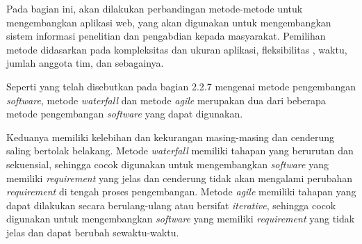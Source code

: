 Pada bagian ini, akan dilakukan perbandingan metode-metode untuk mengembangkan aplikasi web, 
yang akan digunakan untuk mengembangkan sistem informasi penelitian dan pengabdian kepada 
masyarakat. Pemilihan metode didasarkan pada kompleksitas dan ukuran aplikasi, fleksibilitas 
, waktu, jumlah anggota tim, dan sebagainya. 

Seperti yang telah disebutkan pada bagian 2.2.7 mengenai metode pengembangan \textit{software}, 
metode \textit{waterfall} dan metode \textit{agile} merupakan dua dari beberapa metode 
pengembangan \textit{software} yang dapat digunakan. 

Keduanya memiliki kelebihan dan 
kekurangan masing-masing dan cenderung saling bertolak belakang. Metode \textit{waterfall} 
memiliki tahapan yang berurutan dan sekuensial, sehingga cocok digunakan untuk mengembangkan 
\textit{software} yang memiliki \textit{requirement} yang jelas dan cenderung tidak akan 
mengalami perubahan \textit{requirement} di tengah proses pengembangan. Metode \textit{agile} 
memiliki tahapan yang dapat dilakukan secara berulang-ulang atau bersifat \textit{iterative}, 
sehingga cocok digunakan untuk mengembangkan \textit{software} yang memiliki \textit{requirement} 
yang tidak jelas dan dapat berubah sewaktu-waktu. 